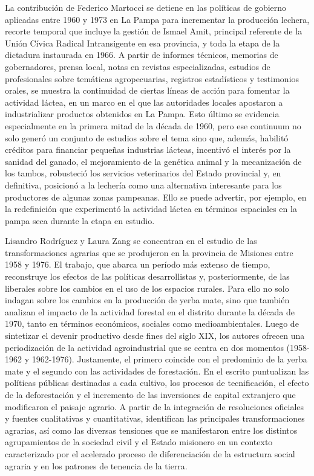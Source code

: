 \documentclass{article}
\begin{document}
La contribución de Federico Martocci se detiene en las políticas de gobierno aplicadas entre 1960 y 1973 en La Pampa para incrementar la producción lechera, recorte temporal que incluye la gestión de Ismael Amit, principal referente de la Unión Cívica Radical Intransigente en esa provincia, y toda la etapa de la dictadura instaurada en 1966. A partir de informes técnicos, memorias de gobernadores, prensa local, notas en revistas especializadas, estudios de profesionales sobre temáticas agropecuarias, registros estadísticos y testimonios orales, se muestra la continuidad de ciertas líneas de acción para fomentar la actividad láctea, en un marco en el que las autoridades locales apostaron a industrializar productos obtenidos en La Pampa. Esto último se evidencia especialmente en la primera mitad de la década de 1960, pero ese continuum no solo generó un conjunto de estudios sobre el tema sino que, además, habilitó créditos para financiar pequeñas industrias lácteas, incentivó el interés por la sanidad del ganado, el mejoramiento de la genética animal y la mecanización de los tambos, robusteció los servicios veterinarios del Estado provincial y, en definitiva, posicionó a la lechería como una alternativa interesante para los productores de algunas zonas pampeanas. Ello se puede advertir, por ejemplo, en la redefinición que experimentó la actividad láctea en términos espaciales en la pampa seca durante la etapa en estudio.

Lisandro Rodríguez y Laura Zang se concentran en el estudio de las transformaciones agrarias que se produjeron en la provincia de Misiones entre 1958 y 1976. El trabajo, que abarca un período más extenso de tiempo, reconstruye los efectos de las políticas desarrollistas y, posteriormente, de las liberales sobre los cambios en el uso de los espacios rurales. Para ello no solo indagan sobre los cambios en la producción de yerba mate, sino que también analizan el impacto de la actividad forestal en el distrito durante la década de 1970, tanto en términos económicos, sociales como medioambientales. Luego de sintetizar el devenir productivo desde fines del siglo XIX, los autores ofrecen una periodización de la actividad agroindustrial que se centra en dos momentos (1958-1962 y 1962-1976). Justamente, el primero coincide con el predominio de la yerba mate y el segundo con las actividades de forestación. En el escrito puntualizan las políticas públicas destinadas a cada cultivo, los procesos de tecnificación, el efecto de la deforestación y el incremento de las inversiones de capital extranjero que modificaron el paisaje agrario. A partir de la integración de resoluciones oficiales y fuentes cualitativas y cuantitativas, identifican las principales transformaciones agrarias, así como las diversas tensiones que se manifestaron entre los distintos agrupamientos de la sociedad civil y el Estado misionero en un contexto caracterizado por el acelerado proceso de diferenciación de la estructura social agraria y en los patrones de tenencia de la tierra.
\end{document}
